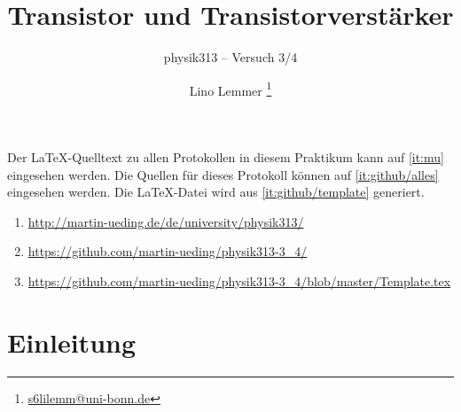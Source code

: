 


\usepackage{placeins}



\subject{Praktikumsprotokoll}
\title{Transistor und Transistorverstärker}
\subtitle{physik313 – Versuch 3/4}
\author{
	Lino Lemmer \footnote{\href{mailto:s6lilemm@uni-bonn.de}{s6lilemm@uni-bonn.de}}
}


\newcommand\IB{I_\text{B}}
\newcommand\IC{I_\text{C}}
\newcommand\ID{I_\text{D}}
\newcommand\IE{I_\text{E}}
\newcommand\IS{I_\text{S}}
\newcommand\RC{R_\text{C}}
\newcommand\RE{R_\text{E}}
\newcommand\UBE{U_\text{BE}}
\newcommand\UB{U_\text{B}}
\newcommand\UCE{U_\text{CE}}
\newcommand\UE{U_\text{E}}
\newcommand\UGS{U_\text{GS}}



\maketitle

Der \LaTeX-Quelltext zu allen Protokollen in diesem Praktikum kann auf
\ref{it:mu} eingesehen werden. Die Quellen für dieses Protokoll können auf
\ref{it:github/alles} eingesehen werden. Die \LaTeX-Datei wird aus
\ref{it:github/template} generiert.

\begin{enumerate}
	\item
		\label{it:mu}
		\url{http://martin-ueding.de/de/university/physik313/}
	\item
		\label{it:github/alles}
		\url{https://github.com/martin-ueding/physik313-3_4/}
	\item
		\label{it:github/template}
		\url{https://github.com/martin-ueding/physik313-3_4/blob/master/Template.tex}
\end{enumerate}

\tableofcontents
\newpage


\FloatBarrier
\section{Einleitung}

